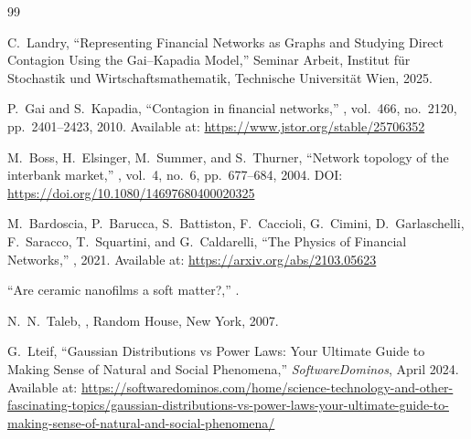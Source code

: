 \documentclass[a4paper,12pt,twoside]{article}
\begin{document}
\newpage
\begin{thebibliography}{99}

\label{landry}
C.~Landry,
\newblock ``Representing Financial Networks as Graphs
and Studying Direct Contagion Using the
Gai--Kapadia Model,''
\newblock Seminar Arbeit, Institut f\"{u}r Stochastik und 
Wirtschaftsmathematik, Technische Universit\"{a}t Wien, 2025.

\label{GK}
P.~Gai and S.~Kapadia,
\newblock ``Contagion in financial networks,''
, vol.~466, no.~2120, 
pp.~2401--2423, 2010.
\newblock Available at: \url{https://www.jstor.org/stable/25706352}

\label{network_topology}
M.~Boss, H.~Elsinger, M.~Summer, and S.~Thurner,
\newblock ``Network topology of the interbank market,''
, vol.~4, no.~6, pp.~677--684, 
2004.
\newblock DOI: \url{https://doi.org/10.1080/14697680400020325}

\label{physics_of_financial}
M.~Bardoscia, P.~Barucca, S.~Battiston, F.~Caccioli, G.~Cimini,
D.~Garlaschelli, F.~Saracco, T.~Squartini, and G.~Caldarelli,
\newblock ``The Physics of Financial Networks,''
, 2021.
\newblock Available at: \url{https://arxiv.org/abs/2103.05623}

\newblock ``Are ceramic nanofilms a soft matter?,''
.

N.~N.~Taleb,
,
\newblock Random House, New York, 2007.

G.~Lteif,
\newblock ``Gaussian Distributions vs Power Laws: Your Ultimate Guide 
to Making Sense of Natural and Social Phenomena,''
\newblock \textit{SoftwareDominos}, April 2024.
\newblock Available at: \url{https://softwaredominos.com/home/science-technology-and-other-fascinating-topics/gaussian-distributions-vs-power-laws-your-ultimate-guide-to-making-sense-of-natural-and-social-phenomena/}


\end{thebibliography}
\end{document}
